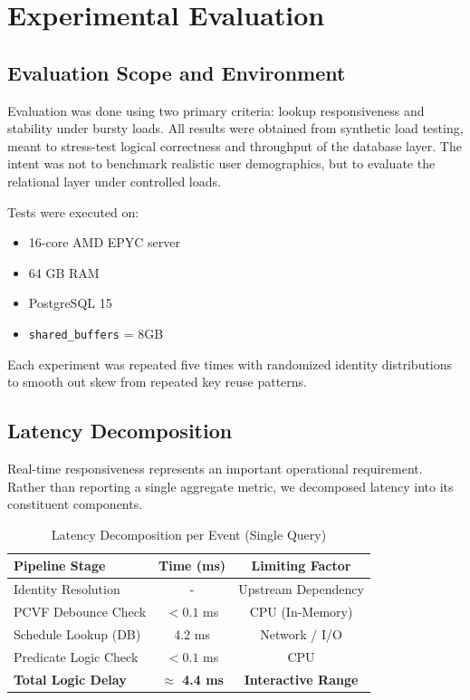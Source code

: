 \documentclass[conference]{IEEEtran}
\begin{document}
\section{Experimental Evaluation}

\subsection{Evaluation Scope and Environment}
Evaluation was done using two primary criteria: lookup responsiveness and stability under bursty loads. All results were obtained from synthetic load testing, meant to stress-test logical correctness and throughput of the database layer. The intent was not to benchmark realistic user demographics, but to evaluate the relational layer under controlled loads.

Tests were executed on:
\begin{itemize}
    \item 16-core AMD EPYC server
    \item 64 GB RAM
    \item PostgreSQL 15
    \item \texttt{shared\_buffers} = 8GB
\end{itemize}
Each experiment was repeated five times with randomized identity distributions to smooth out skew from repeated key reuse patterns.

\subsection{Latency Decomposition}
Real-time responsiveness represents an important operational requirement. Rather than reporting a single aggregate metric, we decomposed latency into its constituent components.

\begin{table}[htbp]
\caption{Latency Decomposition per Event (Single Query)}
\begin{center}
\begin{tabular}{lcc}
\toprule
\textbf{Pipeline Stage} & \textbf{Time (ms)} & \textbf{Limiting Factor} \\
\midrule
Identity Resolution & - & Upstream Dependency \\
PCVF Debounce Check & $<0.1$ ms & CPU (In-Memory) \\
Schedule Lookup (DB) & 4.2 ms & Network / I/O \\
Predicate Logic Check & $<0.1$ ms & CPU \\
\textbf{Total Logic Delay} & \textbf{$\approx$ 4.4 ms} & \textbf{Interactive Range} \\
\bottomrule
\end{tabular}
\end{center}
\end{table}
\end{document}
